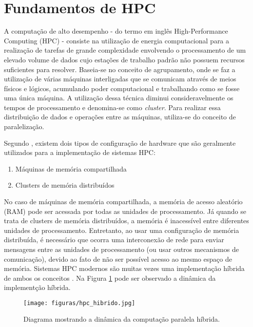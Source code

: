 \section{Fundamentos de HPC}
A computação de alto desempenho - do termo em inglês High-Performance Computing (HPC) - consiste na utilização de energia computacional para a realização de tarefas de grande complexidade envolvendo o processamento de um elevado volume de dados cujo estações de trabalho padrão não possuem recursos suficientes para resolver. Baseia-se no conceito de agrupamento, onde se faz a utilização de várias máquinas interligadas que se comunicam através de meios físicos e lógicos, acumulando poder computacional e trabalhando como se fosse uma única máquina. A utilização dessa técnica diminui consideravelmente os tempos de processamento e denomina-se como \textit{cluster}. Para realizar essa distribuição de dados e operações entre as máquinas, utiliza-se do conceito de paralelização.

Segundo  , existem dois tipos de configuração de hardware  que são geralmente utilizados para  a implementação de sistemas HPC:

\begin{enumerate}
\item Máquinas de memória compartilhada 
\item Clusters de memória distribuídos 
\end{enumerate}

No caso de máquinas de memória compartilhada, a memória de acesso aleatório (RAM) pode ser acessada por todas as unidades de processamento. Já quando se trata de clusters de memória distribuídos, a memória é inacessível entre diferentes unidades de processamento. Entretanto, ao usar uma configuração de memória distribuída, é necessário que ocorra uma interconexão de rede para enviar mensagens entre as unidades de processamento (ou usar outros mecanismos de comunicação), devido ao fato de não ser possível acesso ao mesmo espaço de memória. Sistemas HPC modernos são muitas vezes uma implementação híbrida de ambos os conceitos \cite{wojciechowskijava}. Na Figura \ref{fig:hpc-hibrido} pode ser observado a dinâmica da implementção híbrida.

\begin{figure}[htb]
	\caption{\label{fig:hpc-hibrido} Diagrama mostrando a dinâmica da computação paralela híbrida.}
	\begin{center}
	    \texttt{[image: figuras/hpc\_hibrido.jpg]}
	\end{center}
\end{figure}

